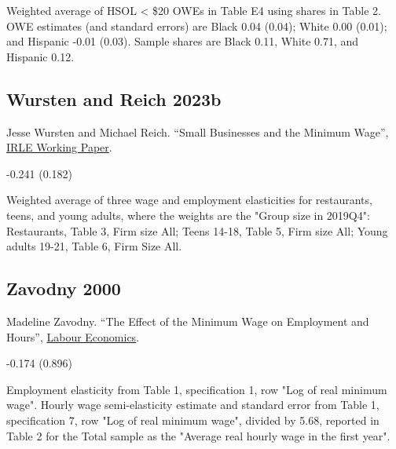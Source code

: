 \vspace{0.7em}

 Weighted average of HSOL < \$20 OWEs in Table E4 using shares in Table 2. OWE estimates (and standard errors) are Black 0.04 (0.04); White 0.00 (0.01); and Hispanic -0.01 (0.03). Sample shares are Black 0.11, White 0.71, and Hispanic 0.12.

\subsection*{Wursten and Reich 2023b}
\vspace{-0.7em}

\noindent Jesse Wursten and Michael Reich. ``Small Businesses and the Minimum Wage'', \href{https://irle.berkeley.edu/wp-content/uploads/2023/03/Small-Businesses-and-the-Minimum-Wage-3-14-23.pdf}{IRLE Working Paper}.

\vspace{0.7em}

 -0.241 (0.182)

\vspace{0.7em}

 Weighted average of three wage and employment elasticities for restaurants, teens, and young adults, where the weights are the "Group size in 2019Q4": Restaurants, Table 3, Firm size All; Teens 14-18, Table 5, Firm size All; Young adults 19-21, Table 6, Firm Size All.

\subsection*{Zavodny 2000}
\vspace{-0.7em}

\noindent Madeline Zavodny. ``The Effect of the Minimum Wage on Employment and Hours'', \href{https://doi.org/10.1016/S0927-5371(00)00021-X}{Labour Economics}.

\vspace{0.7em}

 -0.174 (0.896)

\vspace{0.7em}

 Employment elasticity from Table 1, specification 1, row "Log of real minimum wage". Hourly wage semi-elasticity estimate and standard error from Table 1, specification 7, row "Log of real minimum wage", divided by 5.68, reported in Table 2 for the Total sample as the "Average real hourly wage in the first year".

